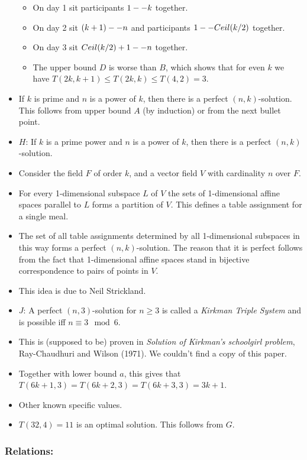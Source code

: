 \documentclass[a4paper]{article}
\begin{document}
\begin{itemize}
  \begin{itemize}
  \item
    On day 1 sit participants $1-\/-k$ together.
  \item
    On day 2 sit $(k+1)-\/-n$ and participants
    $1-\/-Ceil(k/2)$ together.
  \item
    On day 3 sit $Ceil(k/2)+1-\/-n$ together.
  \item
    The upper bound $D$ is worse than $B$, which shows
    that for even $k$ we have
    $T(2k,k+1)\leq T(2k,k)\leq T(4,2)=3$.
  \end{itemize}
\item
  If $k$ is prime and $n$ is a power of $k$, then
  there is a perfect $(n,k)$-solution. This follows from upper
  bound $A$ (by induction) or from the next bullet point.
\item
  $H$: If $k$ is a prime power and $n$ is a power
  of $k$, then there is a perfect $(n,k)$-solution.
\item
  Consider the field $F$ of order $k$, and a vector field
  $V$ with cardinality $n$ over $F$.
\item
  For every 1-dimensional subspace $L$ of $V$ the sets of
  1-dimensional affine spaces parallel to $L$ forms a partition
  of $V$. This defines a table assignment for a single meal.
\item
  The set of all table assignments determined by all 1-dimensional
  subspaces in this way forms a perfect $(n,k)$-solution. The
  reason that it is perfect follows from the fact that 1-dimensional
  affine spaces stand in bijective correspondence to pairs of points in
  $V$.
\item
  This idea is due to Neil Strickland.
\item
  $J$: A perfect $(n,3)$-solution for $n\geq 3$ is
  called a \emph{Kirkman Triple System} and is possible iff
  $n\equiv3\mod6$.
\item
  This is (supposed to be) proven in \emph{Solution of Kirkman's
  schoolgirl problem}, Ray-Chaudhuri and Wilson (1971). We couldn't find
  a copy of this paper.
\item
  Together with lower bound $a$, this gives that
  $T(6k+1,3)=T(6k+2,3)=T(6k+3,3)=3k+1$.
\item
  Other known specific values.
\item
  $T(32,4)=11$ is an optimal solution. This follows from
  $G$.
\end{itemize}

\subsubsection{Relations:}\label{relations}
\end{document}
